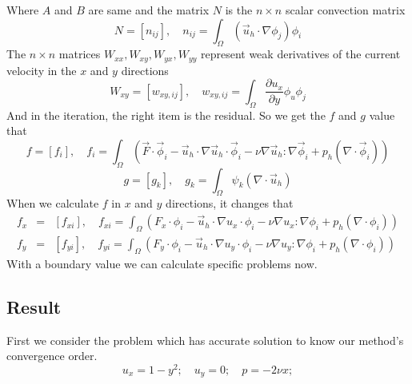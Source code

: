 \documentclass[a4paper]{article}
\begin{document}
Where $A$ and $B$ are same and the matrix $N$ is the $n\times n$ scalar convection matrix
\begin{equation}
N = [n_{ij}], \quad n_{ij} = \int_{\Omega} (\vec{u}_h\cdot \nabla\phi_j)\phi_i
\label{mt::N}
\end{equation}
The $n\times n$ matrices $W_{xx}, W_{xy}, W_{yx}, W_{yy}$ represent weak derivatives of the current velocity in the $x$ and $y$ directions
\begin{equation}
W_{xy} = [w_{xy,ij}],\quad w_{xy,ij} = \int_{\Omega} \frac{\partial u_x}{\partial y}\phi_u \phi_j
\label{mt::W}
\end{equation}
And in the iteration, the right item is the residual. So we get the $f$ and $g$ value that
\begin{equation}
f = [f_i],\quad f_i=\int_{\Omega}(\vec{F}\cdot\vec{\phi}_i-\vec{u}_h\cdot\nabla\vec{u}_h\cdot\vec{\phi}_i-\nu\nabla\vec{u}_h:\nabla\vec{\phi}_i+p_h(\nabla\cdot\vec{\phi}_i))
\end{equation}
\begin{equation}
g = [g_k],\quad g_k=\int_{\Omega}\psi_k(\nabla \cdot \vec{u}_h)
\end{equation}
When we calculate $f$ in $x$ and $y$ directions, it changes that
\begin{equation}
\begin{array}{rcl}
f_x &=& [f_{xi}],\quad f_{xi}=\int_{\Omega}(F_x\cdot\phi_i-\vec{u}_h\cdot\nabla u_x\cdot\phi_i-\nu\nabla u_x:\nabla\phi_i+p_h(\nabla\cdot\phi_i)) \\
f_y &=& [f_{yi}],\quad f_{yi}=\int_{\Omega}(F_y\cdot\phi_i-\vec{u}_h\cdot\nabla u_y\cdot\phi_i-\nu\nabla u_y:\nabla\phi_i+p_h(\nabla\cdot\phi_i))
\label{mt::f}
\end{array}
\end{equation}
With a boundary value we can calculate specific problems now.
\newpage
\subsection{Result}
First we consider the problem which has accurate solution to know our method's convergence order.
\begin{equation}
u_x = 1-y^2;\quad u_y = 0;\quad p=-2\nu x;
\label{pr::accurate}
\end{equation}
\end{document}
